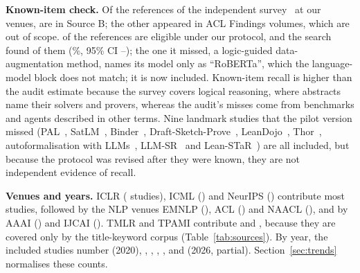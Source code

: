 \textbf{Known-item check.} Of the  references of the independent survey~\cite{cheng2025empowering} at our venues,  are in Source B; the other  appeared in ACL Findings volumes, which are out of scope.  of the references are eligible under our protocol, and the search found  of them (\%, 95\% CI --); the one it missed, a logic-guided data-augmentation method, names its model only as ``RoBERTa'', which the language-model block does not match; it is now included. Known-item recall is higher than the audit estimate because the survey covers logical reasoning, where abstracts name their solvers and provers, whereas the audit's misses come from benchmarks and agents described in other terms. Nine landmark studies that the pilot version missed (PAL~\cite{gao2023pal}, SatLM~\cite{ye2023satlm}, Binder~\cite{cheng2023binding}, Draft-Sketch-Prove~\cite{jiang2023draft}, LeanDojo~\cite{yang2023leandojo}, Thor~\cite{jiang2022thor}, autoformalisation with LLMs~\cite{wu2022autoformalization}, LLM-SR~\cite{shojaee2025sr} and Lean-STaR~\cite{lin2025lean}) are all included, but because the protocol was revised after they were known, they are not independent evidence of recall.

\textbf{Venues and years.} ICLR ( studies), ICML () and NeurIPS () contribute most studies, followed by the NLP venues EMNLP (), ACL () and NAACL (), and by AAAI () and IJCAI (). TMLR and TPAMI contribute  and , because they are covered only by the title-keyword corpus (Table~\ref{tab:sources}). By year, the included studies number  (2020), , , , ,  and  (2026, partial). Section~\ref{sec:trends} normalises these counts.
